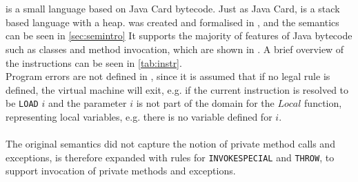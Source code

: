 \section{\jcl}
\jcl is a small language based on Java Card bytecode. Just as Java Card, \jcl is a stack based language with a heap. \jcl was created and formalised in \cite{javasec}, and the semantics can be seen in \cref{sec:semintro}
It supports the majority of features of Java bytecode such as classes and method invocation, which are shown in . 
A brief overview of the instructions can be seen in \cref{tab:instr}.\\

\noindent Program errors are not defined in \jcl, since it is assumed that if no legal rule is defined, the virtual machine will exit, e.g. if the current instruction is resolved to be \texttt{LOAD} $i$ and the parameter $i$ is not part of the domain for the $Local$ function, representing local variables, e.g. there is no variable defined for $i$.\\\\
The original semantics did not capture the notion of private method calls and exceptions, \jcl is therefore expanded with rules for \texttt{INVOKESPECIAL} and \texttt{THROW}, to support invocation of private methods and exceptions.


